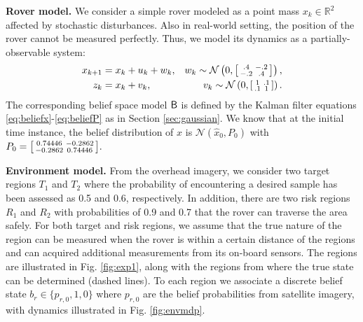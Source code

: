 \documentclass{ifacconf}
\begin{document}
\textbf{Rover model.} We consider a simple rover modeled as a point mass $x_k \in \mathbb{R}^2$ affected by stochastic disturbances. Also in real-world setting, the position of the rover cannot be measured perfectly. Thus, we model its dynamics as a partially-observable system:
\begin{equation*}
\begin{aligned}
  x_{k+1}&= x_{k} + u_k+ w_k,  & w_k \sim \mathcal{N} \left(0,\begin{bsmallmatrix}.4&-.2\\-.2&.4\end{bsmallmatrix}\right), \\
  z_k&= x_k+v_k, &  v_k \sim \mathcal{N} \left(0,\begin{bsmallmatrix}1&.1\\.1&1\end{bsmallmatrix}\right).
\end{aligned}
\end{equation*}
The corresponding belief space model $\mathsf{B}$ is defined by the Kalman filter equations \eqref{eq:beliefx}-\eqref{eq:beliefP} as in Section \ref{sec:gaussian}. We know that at the initial time instance, the belief distribution of $x$ is $\mathcal N(\hat x_0, P_0)$ with $P_0=\begin{bsmallmatrix} 
 0.74446& -0.2862\\
 -0.2862 &  0.74446
\end{bsmallmatrix}. 
 $


\textbf{Environment model.} From the overhead imagery, we consider two %
 target regions $T_1$ and $T_2$ where the probability of encountering a desired sample has been assessed as 0.5 and 0.6, respectively. In addition, there are two risk regions $R_1$ and $R_2$ with probabilities of 0.9 and 0.7 that the rover can traverse the area safely. For both target and risk regions, we assume that the true nature of the region can be measured when the rover is within a certain distance of the regions and can acquired additional measurements from its on-board sensors. The regions are illustrated in Fig. \ref{fig:exp1}, along with the regions from where the true state can be determined (dashed lines). To each region we associate a discrete belief state $b_r \in \{ p_{r,0}, 1, 0 \}$ where $p_{r,0}$ are the belief probabilities from satellite imagery, with dynamics illustrated in Fig. \ref{fig:envmdp}.
\end{document}
